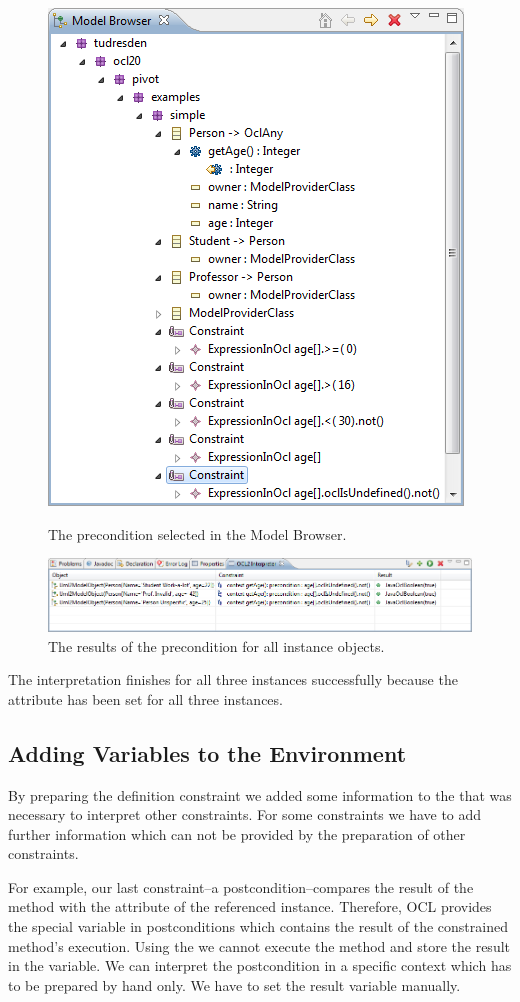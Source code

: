 \begin{figure}[!b]
	\centering
	\includegraphics[width=0.6\linewidth]{figures/interpreter/interpret06}
	\caption{The precondition selected in the Model Browser.}
	\label{pic:interpret:interpret06}

  \vspace{3.0em}
  
	\centering
	\includegraphics[width=1.0\linewidth]{figures/interpreter/interpret07}
	\caption{The results of the precondition for all instance objects.}
	\label{pic:interpret:interpret07}
\end{figure}

The interpretation finishes for all three instances successfully because the attribute  has been set for all three instances.


\subsection{Adding Variables to the Environment}

By preparing the definition constraint we added some information to the  that was necessary to interpret other constraints. For some constraints we have to add further information which can not be provided by the preparation of other constraints.

For example, our last constraint--a postcondition--compares the result of the method  with the attribute  of the referenced  instance. Therefore, \acs{OCL} provides the special variable  in postconditions which contains the result of the constrained method's execution. Using the  we cannot execute the method  and store the result in the  variable. We can interpret the postcondition in a specific context which has to be prepared by hand only. We have to set the result variable manually.

